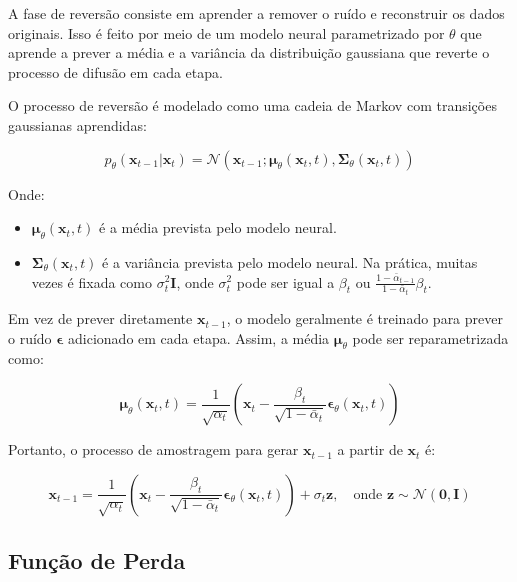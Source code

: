 \documentclass[a4paper]{tufte-handout}
\begin{document}
A fase de reversão consiste em aprender a remover o ruído e reconstruir os dados originais. Isso é feito por meio de um modelo neural parametrizado por $\theta$ que aprende a prever a média e a variância da distribuição gaussiana que reverte o processo de difusão em cada etapa.

O processo de reversão é modelado como uma cadeia de Markov com transições gaussianas aprendidas:

\begin{equation*}
    p_\theta(\mathbf{x}_{t-1} | \mathbf{x}_t) = \mathcal{N}(\mathbf{x}_{t-1}; \boldsymbol{\mu}_\theta(\mathbf{x}_t, t), \boldsymbol{\Sigma}_\theta(\mathbf{x}_t, t))
\end{equation*}

Onde:
\begin{itemize}
    \item $\boldsymbol{\mu}_\theta(\mathbf{x}_t, t)$ é a média prevista pelo modelo neural.
    \item $\boldsymbol{\Sigma}_\theta(\mathbf{x}_t, t)$ é a variância prevista pelo modelo neural. Na prática, muitas vezes é fixada como $\sigma_t^2 \mathbf{I}$, onde $\sigma_t^2$ pode ser igual a $\beta_t$ ou $\frac{1 - \bar{\alpha}_{t-1}}{1 - \bar{\alpha}_t} \beta_t$.
\end{itemize}

Em vez de prever diretamente $\mathbf{x}_{t-1}$, o modelo geralmente é treinado para prever o ruído $\boldsymbol{\epsilon}$ adicionado em cada etapa. Assim, a média $\boldsymbol{\mu}_\theta$ pode ser reparametrizada como:

\begin{equation*}
    \boldsymbol{\mu}_\theta(\mathbf{x}_t, t) = \frac{1}{\sqrt{\alpha_t}} \left( \mathbf{x}_t - \frac{\beta_t}{\sqrt{1 - \bar{\alpha}_t}} \boldsymbol{\epsilon}_\theta(\mathbf{x}_t, t) \right)
\end{equation*}

Portanto, o processo de amostragem para gerar $\mathbf{x}_{t-1}$ a partir de $\mathbf{x}_t$ é:

\begin{equation*}
    \mathbf{x}_{t-1} = \frac{1}{\sqrt{\alpha_t}} \left( \mathbf{x}_t - \frac{\beta_t}{\sqrt{1 - \bar{\alpha}_t}} \boldsymbol{\epsilon}_\theta(\mathbf{x}_t, t) \right) + \sigma_t \mathbf{z}, \quad \text{onde } \mathbf{z} \sim \mathcal{N}(\mathbf{0}, \mathbf{I})
\end{equation*}

\subsection{Função de Perda}
\end{document}
